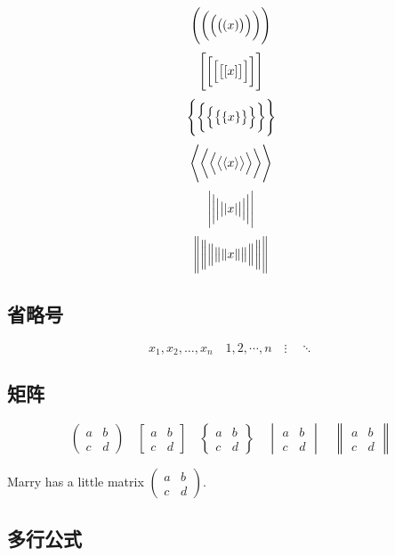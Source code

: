 \documentclass[UTF8]{ctexart} %
\begin{document}
\[ \Biggl(\biggl(\Bigl(\bigl((x)\bigr)\Bigr)\biggr)\Biggr) \]
\[ \Biggl[\biggl[\Bigl[\bigl[[x]\bigr]\Bigr]\biggr]\Biggr] \]
\[ \Biggl \{\biggl \{\Bigl \{\bigl \{\{x\}\bigr \}\Bigr \}\biggr \}\Biggr\} \]
\[ \Biggl\langle\biggl\langle\Bigl\langle\bigl\langle\langle x
\rangle\bigr\rangle\Bigr\rangle\biggr\rangle\Biggr\rangle \]
\[ \Biggl\lvert\biggl\lvert\Bigl\lvert\bigl\lvert\lvert x
\rvert\bigr\rvert\Bigr\rvert\biggr\rvert\Biggr\rvert \]
\[ \Biggl\lVert\biggl\lVert\Bigl\lVert\bigl\lVert\lVert x
\rVert\bigr\rVert\Bigr\rVert\biggr\rVert\Biggr\rVert \]


\subsection{省略号}


\[ x_1,x_2,\dots ,x_n\quad 1,2,\cdots ,n\quad
\vdots\quad \ddots \]

\subsection{矩阵}

\[ \begin{pmatrix} a&b\\c&d \end{pmatrix} \quad
\begin{bmatrix} a&b\\c&d \end{bmatrix} \quad
\begin{Bmatrix} a&b\\c&d \end{Bmatrix} \quad
\begin{vmatrix} a&b\\c&d \end{vmatrix} \quad
\begin{Vmatrix} a&b\\c&d \end{Vmatrix} \]

Marry has a little matrix $ ( \begin{smallmatrix} a&b\\c&d \end{smallmatrix} ) $.


\subsection{多行公式}
\end{document}
